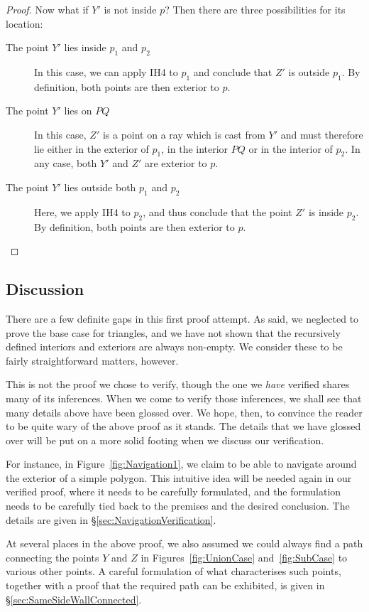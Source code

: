 \begin{description}
\begin{proof}
    Now what if $Y'$ is not inside $p$? Then there are three possibilities for its location:
    \begin{description}
    \item[The point $Y'$ lies inside $p_1$ and $p_2$] In this case, we can apply IH4 to $p_1$ and conclude that $Z'$ is outside $p_1$. By definition, both points are then exterior to $p$. 
    \item[The point $Y'$ lies on $PQ$] In this case, $Z'$ is a point on a ray which is cast from $Y'$ and must therefore lie either in the exterior of $p_1$, in the interior $PQ$ or in the interior of $p_2$. In any case, both $Y'$ and $Z'$ are exterior to $p$.
    \item[The point $Y'$ lies outside both $p_1$ and $p_2$] Here, we apply IH4 to $p_2$, and thus conclude that the point $Z'$ is inside $p_2$. By definition, both points are then exterior to $p$.
    \end{description}
  \end{proof}
\end{description}

\subsection{Discussion}
There are a few definite gaps in this first proof attempt. As said, we neglected to prove the base case for triangles, and we have not shown that the recursively defined interiors and exteriors are always non-empty. We consider these to be fairly straightforward matters, however. 

This is not the proof we chose to verify, though the one we \emph{have} verified shares many of its inferences. When we come to verify those inferences, we shall see that many details above have been glossed over. We hope, then, to convince the reader to be quite wary of the above proof as it stands. The details that we have glossed over will be put on a more solid footing when we discuss our verification.

\label{sec:Jordan1NavigationDiscussion}For instance, in Figure~\ref{fig:Navigation1}, we claim to be able to navigate around the exterior of a simple polygon. This intuitive idea will be needed again in our verified proof, where it needs to be carefully formulated, and the formulation needs to be carefully tied back to the premises and the desired conclusion. The details are given in \S\ref{sec:NavigationVerification}.

\label{sec:Jordan1SameSideDiscussion}At several places in the above proof, we also assumed we could always find a path connecting the points $Y$ and $Z$ in Figures~\ref{fig:UnionCase} and~\ref{fig:SubCase} to various other points. A careful formulation of what characterises such points, together with a proof that the required path can be exhibited, is given in \S\ref{sec:SameSideWallConnected}.

